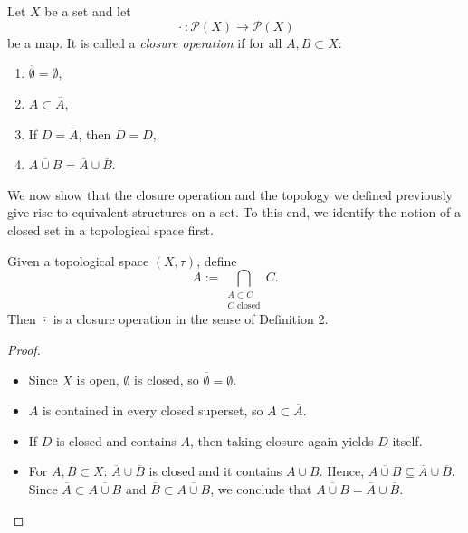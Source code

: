 \begin{definition}
Let \(X\) be a set and let
\[
\overline{\cdot} : \mathcal{P}(X) \to \mathcal{P}(X)
\]
be a map. It is called a \emph{closure operation} if for all \(A, B \subset X\):
\begin{enumerate}
  \item[(i)] \(\overline{\emptyset} = \emptyset\),
  \item[(ii)] \(A \subset \overline{A}\),
  \item[(iii)] If \(D = \overline{A}\), then \(\overline{D} = D\),
  \item[(iv)] \(\overline{A \cup B} = \overline{A} \cup \overline{B}\).
\end{enumerate}
\end{definition}

We now show that the closure operation and the topology we defined previously give rise to equivalent structures on a set. To this end, we identify the notion of a closed set in a topological space first.



\begin{proposition}
Given a topological space \((X, {\tau})\), define
\[
\overline{A} := \bigcap_{\substack{A \subset C \\ C \text{ closed}}} C.
\]
Then \(\overline{\cdot}\) is a closure operation in the sense of Definition 2.
\end{proposition}

\begin{proof}
\begin{itemize}
  \item[(i)] Since \(X\) is open, \(\emptyset\) is closed, so \(\overline{\emptyset} = \emptyset\).
  \item[(ii)] \(A\) is contained in every closed superset, so \(A \subset \overline{A}\).
  \item[(iii)] If \(D\) is closed and contains \(A\), then taking closure again yields \(D\) itself.
  \item[(iv)] For \(A,B \subset X\): $\overline{A}\cup\overline{B}$ is closed and it contains \(A \cup B\). Hence, \(\overline{A \cup B} \subseteq \overline{A} \cup \overline{B}\). Since $\overline{A}\subset \overline{A \cup B}$ and $\overline{B}\subset \overline{A \cup B}$, we conclude that \(\overline{A \cup B} = \overline{A} \cup \overline{B}\).
\end{itemize}
\end{proof}

